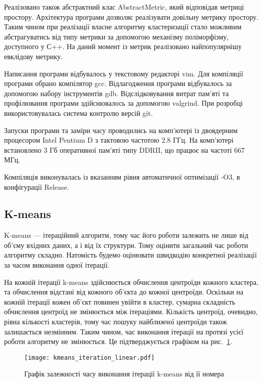             Реалізовано також абстрактний клас AbstractMetric, який відповідав метриці простору. Архітектура програми дозволяє реалізувати довільну метрику простору. Таким чином при реалізації власне алгоритму кластеризації стало можливим абстрагуватись від типу метрики за допомогою механізму поліморфізму, доступного у С++. На даний момент із метрик реалізовано найпопулярнішу евклідову метрику.
            
            Написання програми відбувалось у текстовому редакторі vim. Для компіляції програми обрано компілятор gcc. Відлагодження програми відбувалось за допомогою набору інструментів gdb. Відслідковування витрат пам'яті та профілювання програми здійснювалось за допомогою valgrind. При розробці використовувалась система контролю версій git.
            
            Запуски програми та заміри часу проводились на комп’ютері із двоядерним процесором Intel Pentium D з тактовою частотою 2.8 ГГц. На комп’ютері встановлено 3 Гб оперативної пам’яті типу DDRII, що працює на частоті 667 МГц.
            
            Компіляція виконувалась із вказанням рівня автоматичної оптимізації -O3, в конфігурації Release.
            
            \subsection{K-means}
            
                K-means --- ітераційний алгоритм, тому час його роботи залежить не лише від об’єму вхідних даних, а і від їх структури. Тому оцінити загальний час роботи алгоритму складно. Натомість будемо оцінювати швидкодію конкретної реалізації за часом виконання одної ітерації. 
                
                На кожній ітерації k-means здійснюється обчислення центроїди кожного кластера, та обчислення відстані від кожного об’єкта до кожної центроїди. Оскільки на кожній ітерації кожен об’єкт повинен увійти в кластер, сумарна складність обчислення центроїд не змінюється між ітераціями. Кількість центроїд, очевидно, рівна кількості кластерів, тому час пошуку найближчої центроїди також залишається незмінним. Таким чином, час виконання ітерації на протязі усієї роботи алгоритму не змінюється. Це підтверджується графіком на рис.~\ref{fig:kmeans_linear}.
                
                
                
                \begin{figure}
                    \centering
                    \texttt{[image: kmeans\_iteration\_linear.pdf]}
                    \caption{Графік залежності часу виконання ітерації k-means від її номера}\label{fig:kmeans_linear}
                \end{figure}
            
                     
